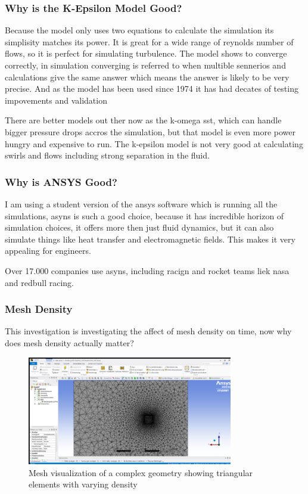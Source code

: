 \documentclass[12pt,a4paper]{article}
\begin{document}
\subsubsection{Why is the K-Epsilon Model Good?}

Because the model only uses two equations to calculate the simulation its simplisity matches its power. It is great for a wide range of reynolds number of flows, so it is perfect for simulating turbulence. The model shows to converge correctly, in simulation converging is referred to when multible sennerios and calculations give the same answer which means the answer is likely to be very precise. And as the model has been used since 1974 it has had decates of testing impovements and validation

There are better models out ther now as the k-omega sst, which can handle bigger pressure drops accros the simulation, but that model is even more power hungry and expensive to run. The k-epsilon model is not very good at calculating swirls and flows including strong separation in the fluid.

\subsubsection{Why is ANSYS Good?}

I am using a student version of the ansys software which is running all the simulations, asyns is such a good choice, because it has incredible horizon of simulation choices, it offers more then just fluid dynamics, but it can also simulate things like heat transfer and electromagnetic fields. This makes it very appealing for engineers. 

Over 17.000 companies use asyns, including racign and rocket teams liek nasa and redbull racing.

\subsubsection{Mesh Density}

This investigation is investigating the affect of mesh density on time, now why does mesh density actually matter?

\begin{figure}[H]
    \centering
    \includegraphics[width=0.8\textwidth]{image9.png}
    \caption{Mesh visualization of a complex geometry showing triangular elements with varying density}
    \label{fig:mesh_example}
\end{figure}
\end{document}
